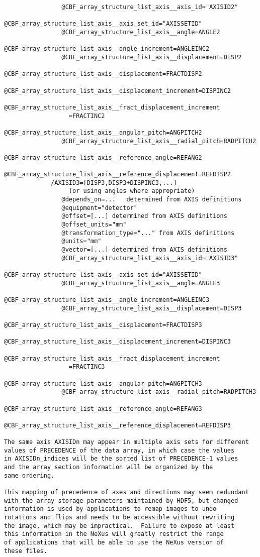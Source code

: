 \documentclass[11pt]{article}
\begin{document}
{\begin{verbatim}
                @CBF_array_structure_list_axis__axis_id="AXISID2"
                @CBF_array_structure_list_axis__axis_set_id="AXISSETID"
                @CBF_array_structure_list_axis__angle=ANGLE2
                @CBF_array_structure_list_axis__angle_increment=ANGLEINC2
                @CBF_array_structure_list_axis__displacement=DISP2
                @CBF_array_structure_list_axis__displacement=FRACTDISP2
                @CBF_array_structure_list_axis__displacement_increment=DISPINC2
                @CBF_array_structure_list_axis__fract_displacement_increment
                  =FRACTINC2
                @CBF_array_structure_list_axis__angular_pitch=ANGPITCH2
                @CBF_array_structure_list_axis__radial_pitch=RADPITCH2
                @CBF_array_structure_list_axis__reference_angle=REFANG2
                @CBF_array_structure_list_axis__reference_displacement=REFDISP2
             /AXISID3=[DISP3,DISP3+DISPINC3,...]
                  (or using angles where appropriate)
                @depends_on=...   determined from AXIS definitions
                @equipment="detector"
                @offset=[...] determined from AXIS definitions
                @offset_units="mm"
                @transformation_type="..." from AXIS definitions
                @units="mm"
                @vector=[...] determined from AXIS definitions
                @CBF_array_structure_list_axis__axis_id="AXISID3"
                @CBF_array_structure_list_axis__axis_set_id="AXISSETID"
                @CBF_array_structure_list_axis__angle=ANGLE3
                @CBF_array_structure_list_axis__angle_increment=ANGLEINC3
                @CBF_array_structure_list_axis__displacement=DISP3
                @CBF_array_structure_list_axis__displacement=FRACTDISP3
                @CBF_array_structure_list_axis__displacement_increment=DISPINC3
                @CBF_array_structure_list_axis__fract_displacement_increment
                  =FRACTINC3
                @CBF_array_structure_list_axis__angular_pitch=ANGPITCH3
                @CBF_array_structure_list_axis__radial_pitch=RADPITCH3
                @CBF_array_structure_list_axis__reference_angle=REFANG3
                @CBF_array_structure_list_axis__reference_displacement=REFDISP3

The same axis AXISIDn may appear in multiple axis sets for different
values of PRECEDENCE of the data array, in which case the values
in AXISIDn_indices will be the sorted list of PRECEDENCE-1 values
and the array section information will be organized by the
same ordering.
           
This mapping of precedence of axes and directions may seem redundant 
with the array storage parameters maintained by HDF5, but changed
information is used by applications to remap images to undo
rotations and flips and needs to be accessible without rewriting
the image, which may be impractical.  Failure to expose at least
this information in the NeXus will greatly restrict the range
of applications that will be able to use the NeXus version of
these files.

\end{verbatim}
}
\end{document}
